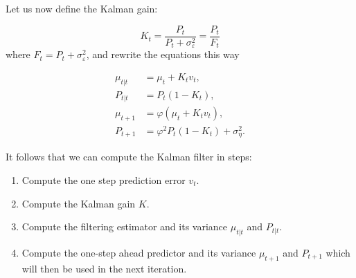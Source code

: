 \documentclass[11pt,a4paper]{article}
\begin{document}
Let us now define the Kalman gain:

\[
K_t = \frac{P_t}{P_t + \sigma^2_\varepsilon} = \frac{P_t}{F_t}
\]
where $F_t = P_t + \sigma^2_\varepsilon$, and rewrite the equations this way

\begin{align*}
    \mu_{t|t} &= \mu_t + K_t v_t,\\
    P_{t|t} &= P_t(1 - K_t),\\
    \mu_{t+1} &= \varphi(\mu_t + K_t v_t),\\
    P_{t+1} &= \varphi^2 P_t(1 - K_t) + \sigma^2_\eta.
\end{align*}

It follows that we can compute the Kalman filter in steps:

\begin{enumerate}
    \item Compute the one step prediction error $v_t$.
    \item Compute the Kalman gain $K$.
    \item Compute the filtering estimator and its variance $\mu_{t|t}$ and $P_{t|t}$.
    \item Compute the one-step ahead predictor and its variance $\mu_{t+1}$ and $P_{t+1}$ which will then be used in the next iteration.
\end{enumerate}
\end{document}
